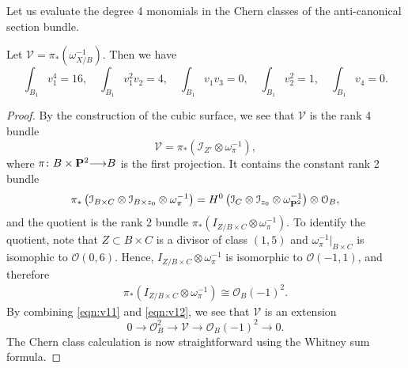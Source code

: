 \documentclass[12pt,reqno]{amsart}
\renewcommand{\to}{{\longrightarrow}}
\numberwithin{equation}{section}
\renewcommand{\O}{\mathcal O}
\begin{document}
Let us evaluate the degree 4 monomials in the Chern classes of the anti-canonical section bundle.
\begin{lemma}\label{lem:v1}
  Let $\mathcal V = \pi_* \left( \omega_{X/B}^{-1} \right)$.
  Then we have
  \[
    \int_{B_{1}}v_{1}^{4} = 16, \quad \int_{B_{1}}v_{1}^{2}v_{2} = 4,\quad \int_{B_{1}}v_{1}v_{3} =0,\quad \int_{B_{1}}v_2^{2} = 1,\quad \int_{B_{1}}v_{4} = 0.\]
\end{lemma}
\begin{proof}
By the construction of the cubic surface, we see that $\mathcal V$ is the rank 4 bundle
\[ \mathcal V = \pi_* (\mathcal I_{Z'} \otimes \omega_{\pi}^{-1}),\]
where $\pi \colon B \times \P^2 \to B$ is the first projection.
It contains the constant rank 2 bundle
\begin{equation}\label{eqn:v11}
  \pi_*\left( \mathcal I_{B \times C} \otimes \mathcal I_{B \times z_0} \otimes \omega_\pi^{-1} \right) = H^0\left(\mathcal I_{C} \otimes \mathcal I_{z_0} \otimes \omega_{\P^2}^{-1}\right) \otimes \O_{B},
\end{equation}
and the quotient is the rank 2 bundle $\pi_*\left( I_{Z/B \times C} \otimes \omega_\pi^{-1} \right)$.
To identify the quotient, note that $Z \subset B \times C$ is a divisor of class $(1,5)$ and $\omega^{-1}_{\pi}|_{B\times C}$ is isomophic to $\O(0,6)$.
Hence, $I_{Z/B \times C} \otimes \omega_\pi^{-1}$ is isomorphic to $\O(-1,1)$, and therefore
\begin{equation}\label{eqn:v12}
  \begin{split}
    \pi_*\left( I_{Z/B \times C} \otimes \omega_\pi^{-1} \right) \cong \O_{B}(-1)^{2}.
  \end{split}
\end{equation}
By combining \eqref{eqn:v11} and \eqref{eqn:v12}, we see that $\mathcal V$ is an extension
\begin{equation}\label{eqn:V1}
  0 \to \O_{B}^2 \to \mathcal V \to \O_{B}(-1)^2 \to 0.
\end{equation}
The Chern class calculation is now straightforward using the Whitney sum formula.
\end{proof}
\end{document}

